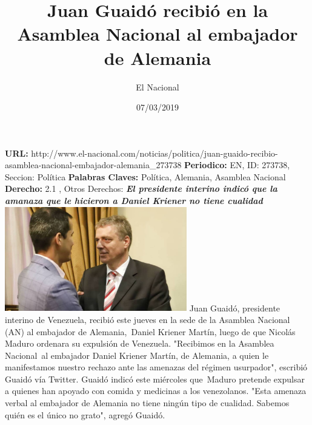 \documentclass{article}%
\title{\textbf{Juan Guaidó recibió en la Asamblea Nacional al embajador de Alemania}}%
\author{El Nacional}%
\date{07/03/2019}%
\begin{document}
%
\normalsize%
\maketitle%
\textbf{URL: }%
http://www.el{-}nacional.com/noticias/politica/juan{-}guaido{-}recibio{-}asamblea{-}nacional{-}embajador{-}alemania\_273738\newline%
%
\textbf{Periodico: }%
EN, %
ID: %
273738, %
Seccion: %
Política\newline%
%
\textbf{Palabras Claves: }%
Política, Alemania, Asamblea Nacional\newline%
%
\textbf{Derecho: }%
2.1%
, Otros Derechos: %
\newline%
%
\textbf{\textit{El presidente interino indicó que la amanaza que le hicieron a Daniel Kriener no tiene cualidad}}%
\newline%
\newline%
%
\includegraphics[width=300px]{EN_273738.jpg}%
\newline%
%
Juan Guaidó, presidente interino de Venezuela, recibió este jueves en la sede de la Asamblea Nacional (AN) al embajador de Alemania,~Daniel Kriener Martín, luego de que Nicolás Maduro ordenara su expulsión de Venezuela.%
\newline%
%
"Recibimos en la Asamblea Nacional~al embajador Daniel Kriener Martín, de Alemania, a quien le manifestamos nuestro rechazo ante las amenazas del régimen usurpador", escribió Guaidó vía Twitter.%
\newline%
%
Guaidó indicó este miércoles que~Maduro pretende expulsar a quienes han apoyado con comida y medicinas a los venezolanos. "Esta amenaza verbal al embajador de Alemania no tiene ningún tipo de cualidad. Sabemos quién es el único no grato", agregó Guaidó.%
\newline%
%
\end{document}
